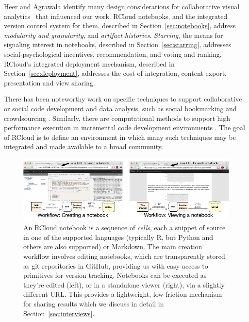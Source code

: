 Heer and Agrawala identify many design considerations for
collaborative visual analytics~\cite{Heer:2008:DCF} that
influenced our work.
RCloud notebooks, and the integrated version control system for them,
described in Section~\ref{sec:notebooks}, address {\it modularity and
granularity}, and {\it artifact histories}.
\emph{Starring}, the means for signaling interest in notebooks, described in
Section~\ref{sec:starring}, addresses social-psychological incentives,
recommendation, and voting and ranking. RCloud's integrated deployment
mechanism, described in Section~\ref{sec:deployment}, addresses the cost of
integration, content export, presentation and view sharing.


There has been noteworthy work on specific techniques
to support collaborative or social code development and data analysis,
such as social bookmarking \cite{Millen:2006:DSB} \cite{Heer:2007:VAV}
and crowdsourcing \cite{Fast:2014:ECS}.
Similarly, there are computational methods to support high
performance execution in incremental code development
environments \cite{Guo:2010:TPI}.
The goal of RCloud is to define an environment in which many such
techniques may be integrated and made available to a broad community.
\begin{figure}
  \centering
\includegraphics[width=.85\linewidth]{fig/notebook/notebook.pdf}
  \vspace{-1em}
\caption{\small \label{fig:notebook}An RCloud notebook is a sequence of
  \emph{cells}, each a snippet of source in one of the supported languages (typically R, but Python and others are also supported) or Markdown. The main creation workflow involves editing notebooks, which are transparently stored as git repositories in GitHub, providing us with easy access to primitives for version tracking. Notebooks can be executed as they're edited (left), or in a standalone viewer (right), via a slightly different URL. This provides a lightweight, low-friction mechanism for sharing results which we discuss in detail in Section~\ref{sec:interviews}. }
\vspace{-1.5em}
\end{figure}

